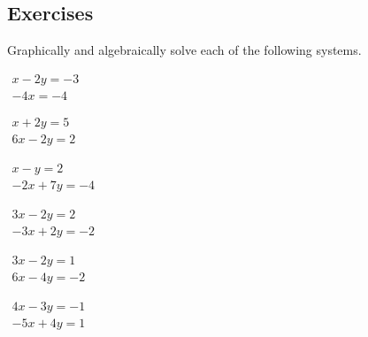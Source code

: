 






\subsection{Exercises}


\begin{exercise} \label{ex:} 
Graphically and algebraically solve each of the following systems.

\begin{parts}
\item\(\begin{array}{l} x-2y=-3\\-4x=-4 \end{array}\)

\item\(\begin{array}{l} x+2y=5\\ 6x -2y=2 \end{array}\)

\item\(\begin{array}{l} x-y=2\\ -2x +7y=-4 \end{array}\)

\item\(\begin{array}{l} 3x -2y=2\\ -3x +2y=-2 \end{array}\)

\item\(\begin{array}{l} 3x -2y=1\\ 6x -4y=-2 \end{array}\)

\item\(\begin{array}{l} 4x -3y=-1\\ -5x +4y=1 \end{array}\)


\end{parts}
\end{exercise}
